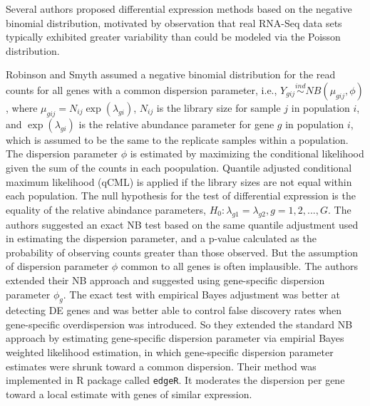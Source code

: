 Several authors proposed differential expression methods based on the negative binomial distribution, motivated by observation that real RNA-Seq data sets typically exhibited greater variability than could be modeled via the Poisson distribution\citep{lorenz2014using}. 

Robinson and Smyth \citep{robinson2007moderated} assumed a negative binomial distribution for the read counts for all genes with a common dispersion parameter, i.e., $Y_{gij} \stackrel{ind}{\sim} NB(\mu_{gij},\phi)$, where $\mu_{gij}=N_{ij}\exp(\lambda_{gi})$, $N_{ij}$ is the library size for sample $j$ in population $i$, and $\exp(\lambda_{gi})$ is the relative abundance parameter for gene $g$ in population $i$, which is assumed to be the same to the replicate samples within a population. The dispersion parameter $\phi$ is estimated by maximizing the conditional likelihood given the sum of the counts in each poopulation. Quantile adjusted conditional maximum likelihood (qCML) is applied if the library sizes are not equal within each population. The null hypothesis for the test of differential expression is the equality of the relative abindance parameters, $H_0: \lambda_{g1} = \lambda_{g2}, g=1,2,...,G$. The authors suggested an exact NB test based on the same quantile adjustment used in estimating the dispersion parameter, and a p-value calculated as the probability of observing counts greater than those observed\citep{lorenz2014using}. But the assumption of dispersion parameter $\phi$ common to all genes is often implausible. The authors extended their NB approach and suggested using gene-specific dispersion parameter $\phi_g$\citep{robinson2007small}. The exact test with empirical Bayes adjustment was better at detecting DE genes and was better able to control false discovery rates when gene-specific overdispersion was introduced\citep{lorenz2014using}. So they extended the standard NB approach by estimating gene-specific dispersion parameter via empirial Bayes weighted likelihood estimation, in which gene-specific dispersion parameter estimates were shrunk toward a common dispersion. Their method was implemented in R package called {\tt edgeR}. It moderates the dispersion per gene toward a local estimate with genes of similar expression. 


